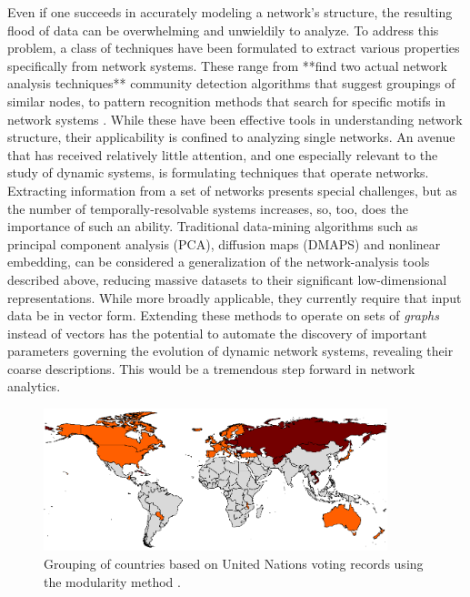 \documentclass[11pt]{article}
\begin{document}
\indent Even if one succeeds in accurately modeling a network's structure, the resulting flood of data can be overwhelming and unwieldily to analyze. To address this problem, a class of techniques have been formulated to extract various properties specifically from network systems. These range from **find two actual network analysis techniques** community detection algorithms that suggest groupings of similar nodes, to pattern recognition methods that search for specific motifs in network systems \cite{Zager2008} \cite{Kleinberg1999} \cite{Newman2004} \cite{neuralnetwork pattern recog}. While these have been effective tools in understanding network structure, their applicability is confined to analyzing single networks. An avenue that has received relatively little attention, and one especially relevant to the study of dynamic systems, is formulating techniques that operate  networks. Extracting information from a set of networks presents special challenges, but as the number of temporally-resolvable systems increases, so, too, does the importance of such an ability. Traditional data-mining algorithms such as principal component analysis (PCA), diffusion maps (DMAPS) and nonlinear embedding, can be considered a generalization of the network-analysis tools described above, reducing massive datasets to their significant low-dimensional representations. While more broadly applicable, they currently require that input data be in vector form. Extending these methods to operate on sets of \textit{graphs} instead of vectors has the potential to automate the discovery of important parameters governing the evolution of dynamic network systems, revealing their coarse descriptions. This would be a tremendous step forward in network analytics.\vspace{1mm}\\
\begin{figure}[h!]
  \centering
  \includegraphics[width=10cm]{unCommunityDetection}
  \caption{Grouping of countries based on United Nations voting records using the modularity method \cite{porter}.}
  \label{fig:un}
\end{figure}
\end{document}
